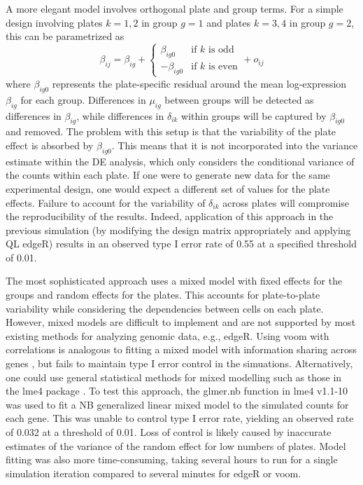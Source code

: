 \documentclass[oupdraft]{bio}
\begin{document}
A more elegant model involves orthogonal plate and group terms.
For a simple design involving plates $k=1,2$ in group $g=1$ and plates $k=3,4$ in group $g=2$, this can be parametrized as
\[
    \beta_{ij} = \beta_{ig} + 
    \begin{cases} 
        \beta_{ig0} & \mbox{if $k$ is odd} \\
        - \beta_{ig0} & \mbox{if $k$ is even}
    \end{cases}
    + o_{ij}
\]
where $\beta_{ig0}$ represents the plate-specific residual around the mean log-expression $\beta_{ig}$ for each group.
Differences in $\mu_{ig}$ between groups will be detected as differences in $\beta_{ig}$, 
    while differences in $\delta_{ik}$ within groups will be captured by $\beta_{ig0}$ and removed.
The problem with this setup is that the variability of the plate effect is absorbed by $\beta_{ig0}$.
This means that it is not incorporated into the variance estimate within the DE analysis, which only considers the conditional variance of the counts within each plate.
If one were to generate new data for the same experimental design, one would expect a different set of values for the plate effects.
Failure to account for the variability of $\delta_{ik}$ across plates will compromise the reproducibility of the results.
Indeed, application of this approach in the previous simulation (by modifying the design matrix appropriately and applying QL edgeR)
    results in an observed type I error rate of 0.55 at a specified threshold of 0.01.

The most sophisticated approach uses a mixed model with fixed effects for the groups and random effects for the plates.
This accounts for plate-to-plate variability while considering the dependencies between cells on each plate.
However, mixed models are difficult to implement and are not supported by most existing methods for analyzing genomic data, e.g., edgeR.
Using voom with correlations is analogous to fitting a mixed model with information sharing across genes \citep{smyth2005limma}, 
    but fails to maintain type I error control in the simuations.
Alternatively, one could use general statistical methods for mixed modelling such as those in the lme4 package \citep{bates2015fitting}.
To test this approach, the glmer.nb function in lme4 v1.1-10 was used to fit a NB generalized linear mixed model to the simulated counts for each gene.
This was unable to control type I error rate, yielding an observed rate of 0.032 at a threshold of 0.01.
Loss of control is likely caused by inaccurate estimates of the variance of the random effect for low numbers of plates.
Model fitting was also more time-consuming, taking several hours to run for a single simulation iteration compared to several minutes for edgeR or voom.
\end{document}
